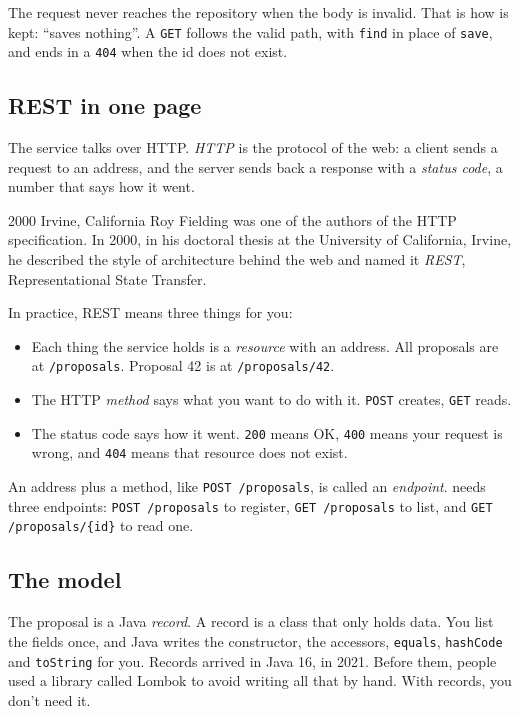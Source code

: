 The request never reaches the repository when the body is invalid. That is
how  is kept: ``saves nothing''. A \texttt{GET} follows the
valid path, with \texttt{find} in place of \texttt{save}, and ends in a
\texttt{404} when the id does not exist.

\subsection*{REST in one page}

The service talks over HTTP. \emph{HTTP} is the protocol of the web: a client
sends a request to an address, and the server sends back a response with a
\emph{status code}, a number that says how it went.

\begin{history}{2000 \textperiodcentered{} Irvine, California}
Roy Fielding was one of the authors of the HTTP specification. In 2000, in his
doctoral thesis at the University of California, Irvine, he described the
style of architecture behind the web and named it \emph{REST},
Representational State Transfer.
\end{history}

In practice, REST means three things for you:

\begin{itemize}
  \item Each thing the service holds is a \emph{resource} with an address.
        All proposals are at \texttt{/proposals}. Proposal 42 is at
        \texttt{/proposals/42}.
  \item The HTTP \emph{method} says what you want to do with it.
        \texttt{POST} creates, \texttt{GET} reads.
  \item The status code says how it went. \texttt{200} means OK, \texttt{400}
        means your request is wrong, and \texttt{404} means that resource
        does not exist.
\end{itemize}

An address plus a method, like \texttt{POST /proposals}, is called an
\emph{endpoint}.  needs three endpoints: \texttt{POST /proposals} to
register, \texttt{GET /proposals} to list, and \texttt{GET /proposals/\{id\}}
to read one.

\subsection*{The model}

The proposal is a Java \emph{record}. A record is a class that only holds
data. You list the fields once, and Java writes the constructor, the
accessors, \texttt{equals}, \texttt{hashCode} and \texttt{toString} for you.
Records arrived in Java 16, in 2021. Before them, people used a library called
Lombok to avoid writing all that by hand. With records, you don't need it.


